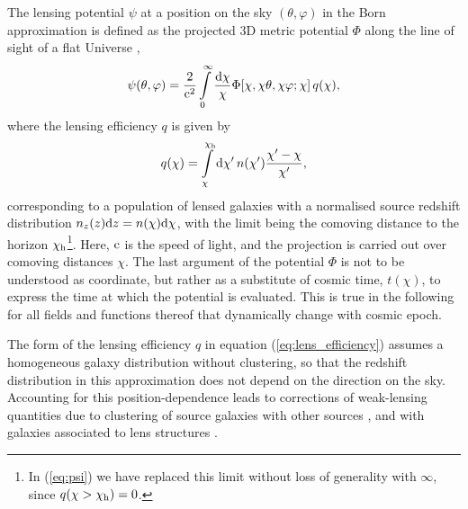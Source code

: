\documentclass[fleqn,usenatbib]{mnras} %
\begin{document}
The lensing potential $\psi$ at a position on the sky $(\theta, \varphi)$ in
the Born approximation is defined as the projected 3D metric potential $\Phi$
along the line of sight of a flat Universe \citep{1998ApJ...498...26K,BS01},
%
%
\begin{equation}
  \psi(\theta, \varphi) = \frac 2 {{\rm c}^2} \int\limits_0^\infty \frac{{\rm d}\chi}{\chi}
    \Phi[\chi, \chi \theta, \chi \varphi; \chi] \, q(\chi),
  \label{eq:psi}
\end{equation}
%
where the lensing efficiency $q$ is given by
%
\begin{equation}
  q(\chi) = \int\limits_\chi^{\chi_{\rm h}} {\rm d} \chi^\prime \, n(\chi^\prime)
    \frac{\chi^\prime - \chi}{\chi^\prime},
  \label{eq:lens_efficiency}
\end{equation}
%
corresponding to a population of lensed galaxies with a normalised source
redshift distribution $n_z(z) {\rm d}z = n(\chi) {\rm d} \chi$, with the limit
being the comoving distance to the horizon $\chi_{\rm h}$\footnote{In
(\ref{eq:psi}) we have replaced this limit without loss of generality with
$\infty$, since $q(\chi > \chi_{\rm h}) = 0$.}. Here, ${\rm c}$ is the speed of
light, and the projection is carried out over comoving distances $\chi$.
The last argument of the potential $\Phi$ is not to
be understood as coordinate, but rather as a substitute of cosmic time,
$t(\chi)$, to express the time at which the potential is evaluated. This is
true in the following for all fields and functions thereof that dynamically
change with cosmic epoch.

The form of the lensing efficiency $q$ in equation (\ref{eq:lens_efficiency})
assumes a homogeneous galaxy distribution without clustering, so that the
redshift distribution in this approximation does not depend on the direction on
the sky. Accounting for this position-dependence leads to corrections of
weak-lensing quantities due to clustering of source galaxies with other sources
\citep{2002A&A...389..729S}, and with galaxies associated to lens structures
\citep{1998A&A...338..375B,H02}.
\end{document}
